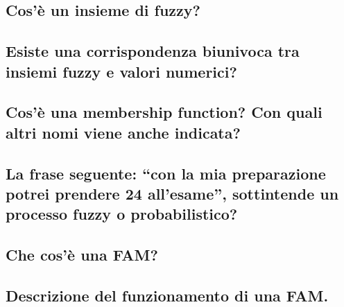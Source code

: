 \documentclass[\main/main.tex]{subfiles}
\begin{document}
\subsection{Cos’è un insieme di fuzzy?}
\subsection{Esiste una corrispondenza biunivoca tra insiemi fuzzy e valori numerici?}
\subsection{Cos’è una membership function? Con quali altri nomi viene anche indicata?}
\subsection{La frase seguente: “con la mia preparazione potrei prendere 24 all’esame”, sottintende un processo fuzzy o probabilistico?}
\subsection{Che cos’è una FAM?}
\subsection{Descrizione del funzionamento di una FAM.}
\end{document}
